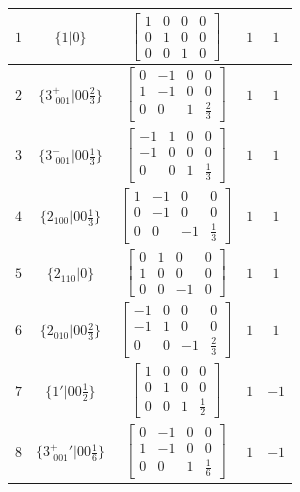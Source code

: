 \documentclass[fleqn,8pt]{jsarticle}
\begin{document}
\begin{longtable}{ccccc}
$ 1 $ & $ \{1|0\} $ & $ \begin{bmatrix} 1 & 0 & 0 & 0 \\ 0 & 1 & 0 & 0 \\ 0 & 0 & 1 & 0 \end{bmatrix} $ & $ 1 $ & $ 1 $ \\ \hline
$ 2 $ & $ \{3^{+}_{\,\,001}|0 0 \frac{2}{3}\} $ & $ \begin{bmatrix} 0 & -1 & 0 & 0 \\ 1 & -1 & 0 & 0 \\ 0 & 0 & 1 & \frac{2}{3} \end{bmatrix} $ & $ 1 $ & $ 1 $ \\ \hline
$ 3 $ & $ \{3^{-}_{\,\,001}|0 0 \frac{1}{3}\} $ & $ \begin{bmatrix} -1 & 1 & 0 & 0 \\ -1 & 0 & 0 & 0 \\ 0 & 0 & 1 & \frac{1}{3} \end{bmatrix} $ & $ 1 $ & $ 1 $ \\ \hline
$ 4 $ & $ \{2{}_{100}|0 0 \frac{1}{3}\} $ & $ \begin{bmatrix} 1 & -1 & 0 & 0 \\ 0 & -1 & 0 & 0 \\ 0 & 0 & -1 & \frac{1}{3} \end{bmatrix} $ & $ 1 $ & $ 1 $ \\ \hline
$ 5 $ & $ \{2{}_{110}|0\} $ & $ \begin{bmatrix} 0 & 1 & 0 & 0 \\ 1 & 0 & 0 & 0 \\ 0 & 0 & -1 & 0 \end{bmatrix} $ & $ 1 $ & $ 1 $ \\ \hline
$ 6 $ & $ \{2{}_{010}|0 0 \frac{2}{3}\} $ & $ \begin{bmatrix} -1 & 0 & 0 & 0 \\ -1 & 1 & 0 & 0 \\ 0 & 0 & -1 & \frac{2}{3} \end{bmatrix} $ & $ 1 $ & $ 1 $ \\ \hline
$ 7 $ & $ \{1{}'|0 0 \frac{1}{2}\} $ & $ \begin{bmatrix} 1 & 0 & 0 & 0 \\ 0 & 1 & 0 & 0 \\ 0 & 0 & 1 & \frac{1}{2} \end{bmatrix} $ & $ 1 $ & $ -1 $ \\ \hline
$ 8 $ & $ \{3^{+}_{\,\,001}{}'|0 0 \frac{1}{6}\} $ & $ \begin{bmatrix} 0 & -1 & 0 & 0 \\ 1 & -1 & 0 & 0 \\ 0 & 0 & 1 & \frac{1}{6} \end{bmatrix} $ & $ 1 $ & $ -1 $ \\ \hline

\end{longtable}
\end{document}
